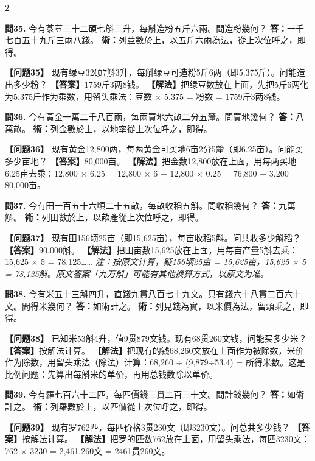 \documentclass[11pt,a4paper]{article}
\begin{document}
\begin{paracol}{2}
\switchcolumn*

\textbf{問35.} 今有菉荳三十二碩七斛三升，每斛造粉五斤六兩。問造粉幾何？\break
\textbf{答：}一千七百五十九斤三兩八錢。\break
\textbf{術：}列荳數於上，以五斤六兩為法，從上次位呼之，即得。

\switchcolumn

\textbf{【问题35】} 现有绿豆32硕7斛3升，每斛绿豆可造粉5斤6两（即5.375斤）。问能造出多少粉？\break
\textbf{【答案】}1759斤3两8钱。\break
\textbf{【解法】}把绿豆数放在上面，先把5斤6两化为5.375斤作为乘数，用留头乘法：豆数 × 5.375 = 粉数 = 1759斤3两8钱。

\switchcolumn*

\textbf{問36.} 今有黃金一萬二千八百兩，每兩買地六畝二分五釐。問買地幾何？\break
\textbf{答：}八萬畝。\break
\textbf{術：}列金數於上，以地率從上次位呼之，即得。

\switchcolumn

\textbf{【问题36】} 现有黄金12,800两，每两黄金可买地6亩2分5釐（即6.25亩）。问能买多少亩地？\break
\textbf{【答案】}80,000亩。\break
\textbf{【解法】}把金数12,800放在上面，用每两买地6.25亩去乘：12,800 × 6.25 = 12,800 × 6 + 12,800 × 0.25 = 76,800 + 3,200 = 80,000亩。

\switchcolumn*

\textbf{問37.} 今有田一百五十六頃二十五畝，每畝收稻五斛。問收稻幾何？\break
\textbf{答：}九萬斛。\break
\textbf{術：}列田數於上，以畝產從上次位呼之，即得。

\switchcolumn

\textbf{【问题37】} 现有田156顷25亩（即15,625亩），每亩收稻5斛。问共收多少斛稻？\break
\textbf{【答案】}90,000斛。\break
\textbf{【解法】}把田亩数15,625放在上面，用每亩产量5斛去乘：15,625 × 5 = 78,125……\break
\textit{注：按原文计算，疑156顷25亩 = 15,625亩，15,625 × 5 = 78,125斛。原文答案「九万斛」可能有其他换算方式，以原文为准。}

\switchcolumn*

\textbf{問38.} 今有米五十三斛四升，直錢九貫八百七十九文。只有錢六十八貫二百六十文。問得米幾何？\break
\textbf{答：}如術計之。\break
\textbf{術：}列見錢為實，以米價為法，留頭乘之，即得。

\switchcolumn

\textbf{【问题38】} 已知米53斛4升，值9贯879文钱。现有68贯260文钱，问能买多少米？\break
\textbf{【答案】}按解法计算。\break
\textbf{【解法】}把现有的钱68,260文放在上面作为被除数，米价作为除数，用留头乘法（除法）计算：68,260 ÷ (9,879÷53.4) = 所得米数。这是比例问题：先算出每斛米的单价，再用总钱数除以单价。

\switchcolumn*

\textbf{問39.} 今有羅七百六十二匹，每匹價錢三貫二百三十文。問計錢幾何？\break
\textbf{答：}如術計之。\break
\textbf{術：}列羅數於上，以匹價從上次位呼之，即得。

\switchcolumn

\textbf{【问题39】} 现有罗762匹，每匹价格3贯230文（即3230文）。问总共多少钱？\break
\textbf{【答案】}按解法计算。\break
\textbf{【解法】}把罗的匹数762放在上面，用留头乘法，每匹3230文：762 × 3230 = 2,461,260文 = 2461贯260文。

\end{paracol}
\end{document}
